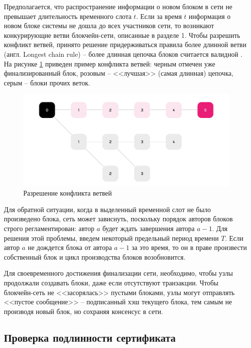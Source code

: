 Предполагается, что распространение информации о новом блоком в сети не превышает длительность временного слота $t$. Если за время $t$ информация о новом блоке системы не дошла до всех участников сети, то возникают конкурирующие ветви блокчейн-сети, описанные в разделе 1. Чтобы разрешить конфликт ветвей, принято решение придерживаться правила более длинной ветви (англ. Longest chain rule) -- более длинная цепочка блоков считается валидной \cite{finality}. На рисунке \ref{fig:a5} приведен пример конфликта ветвей: черным отмечен уже финализированный блок, розовым -- <<лучшая>> (самая длинная) цепочка, серым -- блоки прочих веток.
\begin{figure}[hbtp]
	\centering
	\includegraphics[width=\textwidth]{img/consensus_longest_chain.png}
	\caption{Разрешение конфликта ветвей}
	\label{fig:a5}
\end{figure}

Для обратной ситуации, когда в выделенный временной слот не было произведено блока, сеть может зависнуть, поскольку порядок авторов блоков строго регламентирован: автор $a$ будет ждать завершения автора $a-1$. Для решения этой проблемы, введем некоторый предельный период времени $T$. Если автор $a$ не дождется блока от автора $a-1$ за это время, то он в праве произвести собственный блок и цикл производства блоков возобновится.

Для своевременного достижения финализации сети, необходимо, чтобы узлы продолжали создавать блоки, даже если отсутствуют транзакции. Чтобы блокчейн-сеть не <<засорялась>> пустыми блоками, узлы могут отправлять <<пустое сообщение>> -- подписанный хэш текущего блока, тем самым не производя новый блок, но сохраняя консенсус в сети.


\subsection{Проверка подлинности сертификата}


